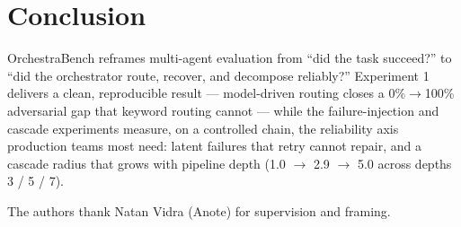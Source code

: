 \documentclass[sigconf,nonacm,anonymous]{acmart}  %
\begin{document}
\section{Conclusion}
OrchestraBench reframes multi-agent evaluation from ``did the task succeed?'' to
``did the orchestrator route, recover, and decompose reliably?'' Experiment 1
delivers a clean, reproducible result --- model-driven routing closes a
0\%$\to$100\% adversarial gap that keyword routing cannot --- while the
failure-injection and cascade experiments measure, on a controlled chain, the
reliability axis production teams most need: latent failures that retry cannot
repair, and a cascade radius that grows with pipeline depth (1.0 $\to$ 2.9 $\to$
5.0 across depths 3 / 5 / 7).

\begin{acks}
The authors thank Natan Vidra (Anote) for supervision and framing.
\end{acks}



\end{document}
